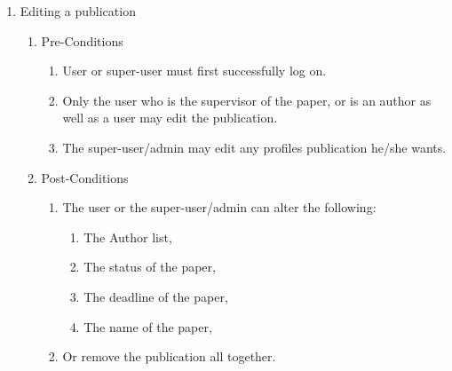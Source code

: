 \documentclass[hidelinks,a4paper,12pt]{article}
\begin{document}
	\begin{enumerate}
		\item  Editing a publication
		
		\begin{enumerate}
			\item  Pre-Conditions
			
			\begin{enumerate}
				\item  User or super-user must first successfully log on.
				
				\item  Only the user who is the supervisor of the paper, or is an author as well as a user may edit the publication.
				
				\item  The super-user/admin may edit any profiles publication he/she wants.
			\end{enumerate}
			
			\item  Post-Conditions
			
			\begin{enumerate}
				\item  The user or the super-user/admin can alter the following:
				
				\begin{enumerate}
					\item  The Author list,
					
					\item  The status of the paper,
					
					\item  The deadline of the paper,
					
					\item  The name of the paper,
				\end{enumerate}
				
				\item  Or remove the publication all together.
			\end{enumerate}
		\end{enumerate}
	\end{enumerate}
	
	\noindent 
	
	\noindent 
	
\end{document}
